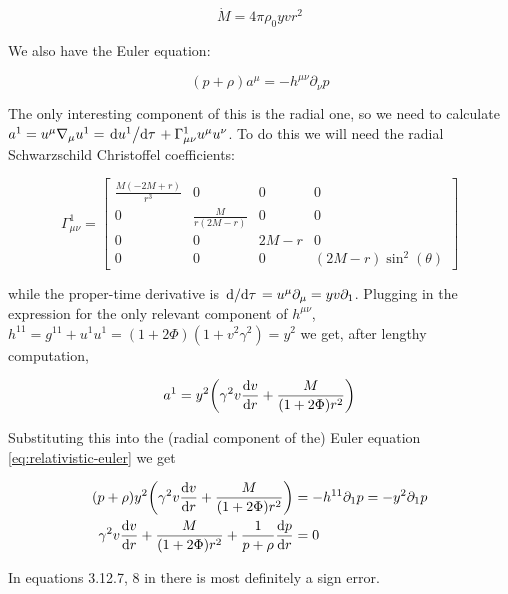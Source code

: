 \documentclass[main.tex]{subfiles}
\begin{document}
\begin{equation}
  \dot{M} = 4 \pi\rho_0 yvr^2
\end{equation}

We also have the Euler equation:

\begin{equation} \label{eq:relativistic-euler}
    (p+\rho) a^\mu = - h^{\mu \nu} \partial_\nu p
\end{equation}

The only interesting component of this is the radial one, so we need to calculate \(a^1 = u^\mu \nabla_\mu u^1 = \dv*{u^1}{\tau} + \Gamma^1_{\mu \nu} u^\mu u^\nu \). To do this we will need the radial Schwarzschild Christoffel coefficients:

\begin{equation}
  \Gamma^1_{\mu \nu} = \left[\begin{matrix}\frac{M \left(- 2 M + r\right)}{r^{3}} & 0 & 0 & 0\\0 & \frac{M}{r \left(2 M - r\right)} & 0 & 0\\0 & 0 & 2 M - r & 0\\0 & 0 & 0 & \left(2 M - r\right) \sin^{2}{\left(\theta \right)}\end{matrix}\right]
\end{equation}

while the proper-time derivative is \(\dv*{}{\tau} = u^\mu \partial_\mu = yv\partial_1\).
Plugging in the expression for the only relevant component of \(h^{\mu\nu}\), \(h^{11} = g^{11} + u^1 u^1 = (1 + 2 \Phi) (1 + v^2 \gamma^2) = y^2\)
we get, after lengthy computation,

\begin{equation}
  a^1 = y^2 \qty(\gamma^2 v \dv{v}{r} + \frac{M}{(1+ 2 \Phi) r^2})
\end{equation}

Substituting this into the (radial component of the) Euler equation \eqref{eq:relativistic-euler} we get

\begin{subequations}
\begin{align}
  (p + \rho) y^2 \qty(\gamma^2 v \dv{v}{r} + \frac{M}{(1+ 2 \Phi) r^2}) &= - h^{1 1} \partial_1 p = - y^2 \partial_1 p \\
   \gamma^2 v \dv{v}{r} + \frac{M}{(1+ 2 \Phi) r^2} + \frac{1}{p + \rho} \dv{p}{r} &= 0
  \label{eq:ideal-euler}
\end{align}
\end{subequations}

\begin{greenbox}
  In equations 3.12.7, 8 in \cite{nobili} there is most definitely a sign error.
\end{greenbox}
\end{document}
